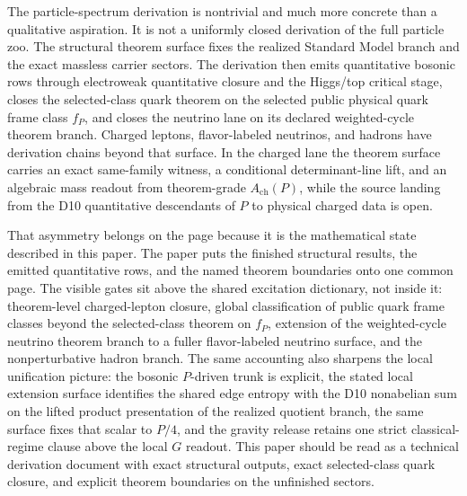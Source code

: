 \documentclass[11pt]{article}
\begin{document}
The particle-spectrum derivation is nontrivial and much more concrete than a qualitative aspiration. It is
not a uniformly closed derivation of the full particle zoo. The structural theorem surface fixes
the realized Standard Model branch and the exact massless carrier sectors. The derivation
then emits quantitative bosonic rows through electroweak quantitative closure and the Higgs/top critical
stage, closes the selected-class quark theorem on the selected public physical quark frame class \(f_P\), and
closes the neutrino lane on its declared weighted-cycle theorem branch. Charged leptons,
flavor-labeled neutrinos, and hadrons have derivation chains beyond that surface. In the charged
lane the theorem surface carries an exact same-family witness, a conditional determinant-line lift,
and an algebraic mass readout from theorem-grade \(A_{\mathrm{ch}}(P)\), while the source landing
from the D10 quantitative descendants of \(P\) to physical charged data is open.

That asymmetry belongs on the page because it is the mathematical state described in
this paper. The paper puts the finished structural results, the emitted quantitative rows, and the
named theorem boundaries onto one common page. The visible gates sit above the shared
excitation dictionary, not inside it: theorem-level charged-lepton closure, global classification
of public quark frame classes beyond the selected-class theorem on \(f_P\), extension of the
weighted-cycle neutrino theorem branch to a fuller flavor-labeled neutrino surface, and the
nonperturbative hadron branch. The same accounting also sharpens the local unification picture:
the bosonic \(P\)-driven trunk is explicit, the stated local extension surface identifies the shared
edge entropy with the D10 nonabelian sum on the lifted product presentation of the realized
quotient branch, the same surface fixes that scalar to \(P/4\), and the gravity release retains one
strict classical-regime clause above the local \(G\) readout. This paper should be read as a technical derivation document
with exact structural outputs, exact selected-class quark closure, and explicit theorem
boundaries on the unfinished sectors.

\appendix

\end{document}
